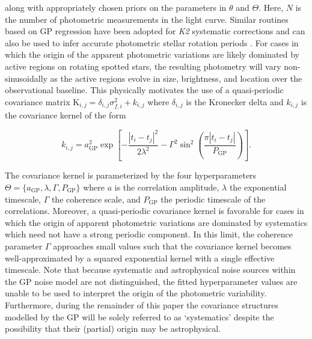 \noindent along with appropriately chosen priors on the parameters in $\theta$ and $\Theta$.
Here, $N$ is the number of photometric measurements in the light curve. Similar routines based on GP regression 
have been adopted for \emph{K2} systematic corrections \citep[e.g.][]{aigrain15,crossfield15,aigrain16} 
and can also be used to infer accurate photometric stellar rotation periods \citep{angus18}. For cases in which
the origin of the apparent photometric variations are likely dominated by active regions on rotating spotted
stars, the resulting photometry will vary non-sinusoidally as the active regions 
evolve in size, brightness, and location over the observational baseline. This physically motivates the
use of a quasi-periodic covariance matrix K$_{i,j} = \delta_{i,j} \sigma_{f,i}^2 + k_{i,j}$ where $\delta_{i,j}$
is the Kronecker delta and $k_{i,j}$ is the covariance kernel of the form

\begin{equation}
  k_{i,j} = a_{\text{GP}}^2 \exp{\left[ - \frac{|t_i-t_j|^2}{2\lambda^2} -\Gamma^2
      \sin^2{\left(\frac{\pi|t_i-t_j|}{P_{\text{GP}}} \right)} \right]}.
\end{equation}

\noindent The covariance kernel is parameterized by the four hyperparameters
$\Theta=\{a_{\text{GP}},\lambda,\Gamma,P_{\text{GP}}\}$ where
$a$ is the correlation amplitude, $\lambda$ the exponential timescale, $\Gamma$ the coherence scale,
and $P_{\text{GP}}$ the periodic timescale of the correlations. Moreover,
a quasi-periodic covariance kernel is favorable for cases in which the origin of
apparent photometric variations are dominated by systematics which need not have a strong periodic
component. In this limit, the coherence parameter $\Gamma$ approaches small values such
that the covariance kernel becomes well-approximated by a squared exponential kernel with a single
effective timescale. Note that because 
systematic and astrophysical noise sources within the GP noise model are not distinguished,
the fitted hyperparameter values are unable to be used to interpret the origin of the photometric
variability. Furthermore, during the remainder of this paper the covariance structures modelled by the
GP will be solely referred to as `systematics' despite the possibility that their (partial) origin may
be astrophysical. \\

